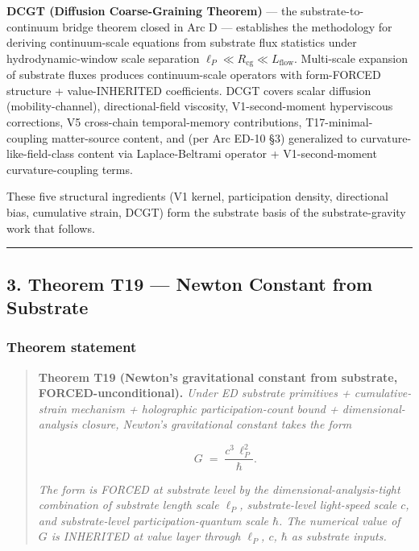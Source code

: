 \documentclass[
  11pt,a4paper]{article}
\begin{document}
\textbf{DCGT (Diffusion Coarse-Graining Theorem)} --- the
substrate-to-continuum bridge theorem closed in Arc D --- establishes
the methodology for deriving continuum-scale equations from substrate
flux statistics under hydrodynamic-window scale separation
\(\ell_P \ll R_\mathrm{cg} \ll L_\mathrm{flow}\). Multi-scale expansion
of substrate fluxes produces continuum-scale operators with form-FORCED
structure + value-INHERITED coefficients. DCGT covers scalar diffusion
(mobility-channel), directional-field viscosity, V1-second-moment
hyperviscous corrections, V5 cross-chain temporal-memory contributions,
T17-minimal-coupling matter-source content, and (per Arc ED-10 §3)
generalized to curvature-like-field-class content via Laplace-Beltrami
operator + V1-second-moment curvature-coupling terms.

These five structural ingredients (V1 kernel, participation density,
directional bias, cumulative strain, DCGT) form the substrate basis of
the substrate-gravity work that follows.

\begin{center}\rule{0.5\linewidth}{0.5pt}\end{center}

\subsection{3. Theorem T19 --- Newton Constant from
Substrate}\label{theorem-t19-newton-constant-from-substrate}

\subsubsection{Theorem statement}\label{theorem-statement}

\begin{quote}
\textbf{Theorem T19 (Newton's gravitational constant from substrate,
FORCED-unconditional).} \emph{Under ED substrate primitives +
cumulative-strain mechanism + holographic participation-count bound +
dimensional-analysis closure, Newton's gravitational constant takes the
form}

\[G \;=\; \frac{c^3\,\ell_P^2}{\hbar}.\]

\emph{The form is FORCED at substrate level by the
dimensional-analysis-tight combination of substrate length scale
\(\ell_P\), substrate-level light-speed scale \(c\), and substrate-level
participation-quantum scale \(\hbar\). The numerical value of \(G\) is
INHERITED at value layer through \(\ell_P\), \(c\), \(\hbar\) as
substrate inputs.}
\end{quote}
\end{document}
